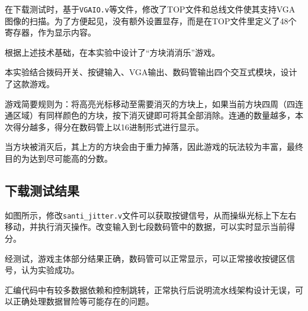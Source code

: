 \documentclass[UTF8,a4paper,autofakebold,15pt]{ctexart}
\begin{document}
	在下载测试时，基于{\tt VGAIO.v}等文件，修改了TOP文件和总线文件使其支持VGA图像的扫描。为了方便起见，没有额外设置显存，而是在TOP文件里定义了48个寄存器，作为显示内容。
	
	根据上述技术基础，在本实验中设计了“方块消消乐”游戏。
	
	本实验结合拨码开关、按键输入、VGA输出、数码管输出四个交互式模块，设计了这款游戏。
	
	游戏简要规则为：将高亮光标移动至需要消灭的方块上，如果当前方块四周（四连通区域）有同样颜色的方块，按下消灭键即可将其全部消除。连通的数量越多，本次得分越多，得分在数码管上以16进制形式进行显示。
	
	当方块被消灭后，其上方的方块会由于重力掉落，因此游戏的玩法较为丰富，最终目的为达到尽可能高的分数。

\subsection{下载测试结果}

	如图所示，修改{\tt santi\_jitter.v}文件可以获取按键信号，从而操纵光标上下左右移动，并执行消灭操作。改变输入到七段数码管中的数据，可以实时显示当前得分。
	
	经测试，游戏主体部分结果正确，数码管可以正常显示，可以正常接收按键区信号，认为实验成功。
	
	汇编代码中有较多数据依赖和控制跳转，正常执行后说明流水线架构设计无误，可以正确处理数据冒险等可能存在的问题。
	
\end{document}
